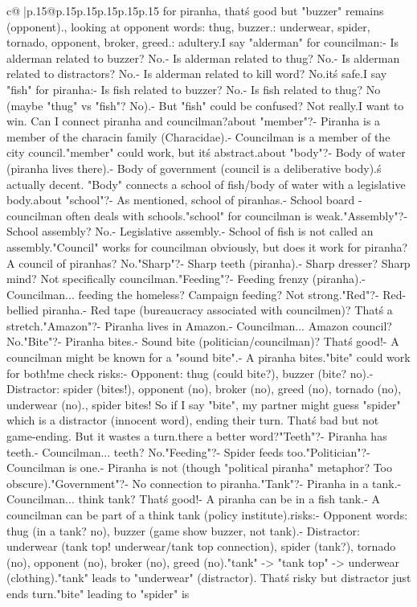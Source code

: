 \documentclass{article}
\begin{document}
{\begin{supertabular}{c@{$\;$}|p{.15\linewidth}@{}p{.15\linewidth}p{.15\linewidth}p{.15\linewidth}p{.15\linewidth}p{.15\linewidth}}
{{{for piranha, that\'s good but "buzzer" remains (opponent).\n\nActually, looking at opponent words: thug, buzzer.\nDistractors: underwear, spider, tornado, opponent, broker, greed.\nKill: adultery.\n\nIf I say "alderman" for councilman:\n- Is alderman related to buzzer? No.\n- Is alderman related to thug? No.\n- Is alderman related to distractors? No.\n- Is alderman related to kill word? No.\nSo it\'s safe.\n\nIf I say "fish" for piranha:\n- Is fish related to buzzer? No.\n- Is fish related to thug? No (maybe "thug" vs "fish"? No).\n- But "fish" could be confused? Not really.\n\nBut I want to win. Can I connect piranha and councilman?\nWhat about "member"?\n- Piranha is a member of the characin family (Characidae).\n- Councilman is a member of the city council.\nSo "member" could work, but it\'s abstract.\n\nWhat about "body"?\n- Body of water (piranha lives there).\n- Body of government (council is a deliberative body).\nThat\'s actually decent. "Body" connects a school of fish/body of water with a legislative body.\n\nWhat about "school"?\n- As mentioned, school of piranhas.\n- School board - councilman often deals with schools.\nBut "school" for councilman is weak.\n\n"Assembly"?\n- School assembly? No.\n- Legislative assembly.\n- School of fish is not called an assembly.\n\n"Council" works for councilman obviously, but does it work for piranha? A council of piranhas? No.\n\n"Sharp"?\n- Sharp teeth (piranha).\n- Sharp dresser? Sharp mind? Not specifically councilman.\n\n"Feeding"?\n- Feeding frenzy (piranha).\n- Councilman... feeding the homeless? Campaign feeding? Not strong.\n\n"Red"?\n- Red-bellied piranha.\n- Red tape (bureaucracy associated with councilmen)? That\'s a stretch.\n\n"Amazon"?\n- Piranha lives in Amazon.\n- Councilman... Amazon council? No.\n\n"Bite"?\n- Piranha bites.\n- Sound bite (politician/councilman)? That\'s good!\n- A councilman might be known for a "sound bite".\n- A piranha bites.\n\nSo "bite" could work for both!\n\nLet me check risks:\n- Opponent: thug (could bite?), buzzer (bite? no).\n- Distractor: spider (bites!), opponent (no), broker (no), greed (no), tornado (no), underwear (no).\nOh, spider bites! So if I say "bite", my partner might guess "spider" which is a distractor (innocent word), ending their turn. That\'s bad but not game-ending. But it wastes a turn.\n\nIs there a better word?\n"Teeth"?\n- Piranha has teeth.\n- Councilman... teeth? No.\n\n"Feeding"?\n- Spider feeds too.\n\n"Politician"?\n- Councilman is one.\n- Piranha is not (though "political piranha" metaphor? Too obscure).\n\n"Government"?\n- No connection to piranha.\n\n"Tank"?\n- Piranha in a tank.\n- Councilman... think tank? That\'s good!\n- A piranha can be in a fish tank.\n- A councilman can be part of a think tank (policy institute).\n\nCheck risks:\n- Opponent words: thug (in a tank? no), buzzer (game show buzzer, not tank).\n- Distractor: underwear (tank top! underwear/tank top connection), spider (tank?), tornado (no), opponent (no), broker (no), greed (no).\n"tank" -> "tank top" -> underwear (clothing).\nSo "tank" leads to "underwear" (distractor). That\'s risky but distractor just ends turn.\n\nBut "bite" leading to "spider" is }}}
\end{supertabular}}
\end{document}
